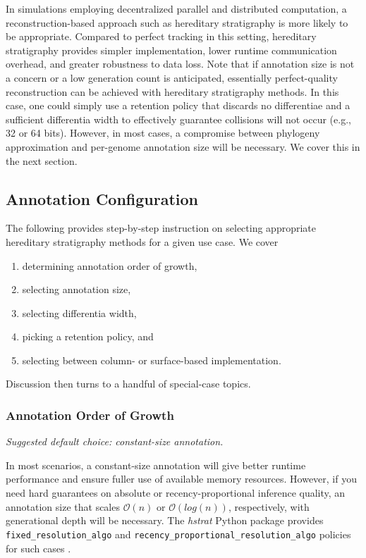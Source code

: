 In simulations employing decentralized parallel and distributed computation, a reconstruction-based approach such as hereditary stratigraphy is more likely to be appropriate.
Compared to perfect tracking in this setting, hereditary stratigraphy provides simpler implementation, lower runtime communication overhead, and greater robustness to data loss.
Note that if annotation size is not a concern or a low generation count is anticipated, essentially perfect-quality reconstruction can be achieved with hereditary stratigraphy methods.
In this case, one could simply use a retention policy that discards no differentiae and a sufficient differentia width to effectively guarantee collisions will not occur (e.g., 32 or 64 bits).
However, in most cases, a compromise between phylogeny approximation and per-genome annotation size will be necessary.
We cover this in the next section.

\subsection{Annotation Configuration}

The following provides step-by-step instruction on selecting appropriate hereditary stratigraphy methods for a given use case.
We cover
\begin{enumerate}
\item determining annotation order of growth,
\item selecting annotation size,
\item selecting differentia width,
\item picking a retention policy, and
\item selecting between column- or surface-based implementation.
\end{enumerate}

Discussion then turns to a handful of special-case topics.

\subsubsection{Annotation Order of Growth}
\textit{Suggested default choice: constant-size annotation.}

In most scenarios, a constant-size annotation will give better runtime performance and ensure fuller use of available memory resources.
However, if you need hard guarantees on absolute or recency-proportional inference quality, an annotation size that scales $\mathcal{O}(n)$ or $\mathcal{O}(log(n))$, respectively, with generational depth will be necessary.
The \textit{hstrat} Python package provides \texttt{fixed\_resolution\_algo} and  \texttt{recency\_proportional\_resolution\_algo} policies for such cases \citep{moreno2022hstrat}.

